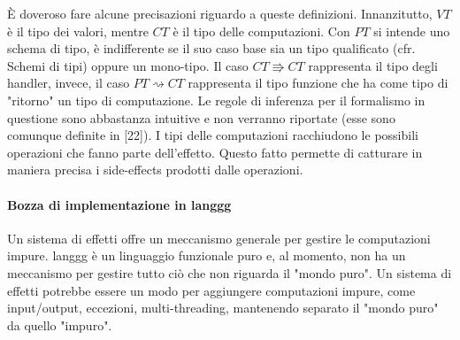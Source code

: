 \documentclass[10pt,a4paper]{article}
\begin{document}
\`E doveroso fare alcune precisazioni riguardo a queste definizioni. Innanzitutto, $ VT $ è il tipo dei valori, mentre
$ CT $ è il tipo delle computazioni. Con $ PT $ si intende uno schema di tipo, è indifferente se il suo caso base sia
un tipo qualificato (cfr. Schemi di tipi) oppure un mono-tipo. Il caso $ CT \Rrightarrow CT $ rappresenta il tipo degli
handler, invece, il caso $ PT \rightsquigarrow CT $ rappresenta il tipo funzione che ha come tipo di "ritorno" un tipo
di computazione. Le regole di inferenza per il formalismo in questione sono abbastanza intuitive e non verranno riportate
(esse sono comunque definite in [22]). I tipi delle computazioni racchiudono le possibili operazioni che fanno parte
dell'effetto. Questo fatto permette di catturare in maniera precisa i side-effects prodotti dalle operazioni.

\paragraph{Bozza di implementazione in langgg}
Un sistema di effetti offre un meccanismo generale per gestire le computazioni impure. langgg è un linguaggio
funzionale puro e, al momento, non ha un meccanismo per gestire tutto ciò che non riguarda il "mondo puro". Un sistema
di effetti potrebbe essere un modo per aggiungere computazioni impure, come input/output, eccezioni, multi-threading,
mantenendo separato il "mondo puro" da quello "impuro".
\end{document}
